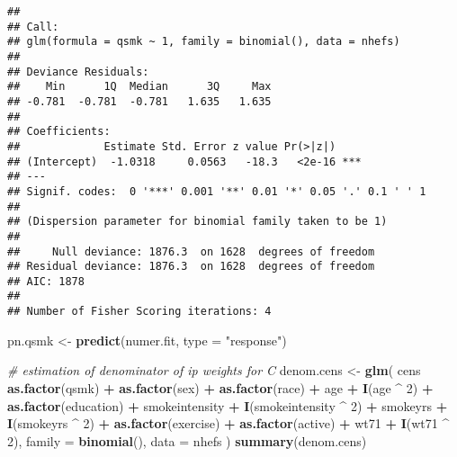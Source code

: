 \documentclass[10pt,]{book}
\newenvironment{Shaded}{\begin{snugshade}}{\end{snugshade}}
\newcommand{\CommentTok}[1]{\textcolor[rgb]{0.56,0.35,0.01}{\textit{#1}}}
\newcommand{\DataTypeTok}[1]{\textcolor[rgb]{0.13,0.29,0.53}{#1}}
\newcommand{\DecValTok}[1]{\textcolor[rgb]{0.00,0.00,0.81}{#1}}
\newcommand{\KeywordTok}[1]{\textcolor[rgb]{0.13,0.29,0.53}{\textbf{#1}}}
\newcommand{\NormalTok}[1]{#1}
\newcommand{\OperatorTok}[1]{\textcolor[rgb]{0.81,0.36,0.00}{\textbf{#1}}}
\newcommand{\StringTok}[1]{\textcolor[rgb]{0.31,0.60,0.02}{#1}}
\begin{document}
\begin{verbatim}
## 
## Call:
## glm(formula = qsmk ~ 1, family = binomial(), data = nhefs)
## 
## Deviance Residuals: 
##    Min      1Q  Median      3Q     Max  
## -0.781  -0.781  -0.781   1.635   1.635  
## 
## Coefficients:
##             Estimate Std. Error z value Pr(>|z|)    
## (Intercept)  -1.0318     0.0563   -18.3   <2e-16 ***
## ---
## Signif. codes:  0 '***' 0.001 '**' 0.01 '*' 0.05 '.' 0.1 ' ' 1
## 
## (Dispersion parameter for binomial family taken to be 1)
## 
##     Null deviance: 1876.3  on 1628  degrees of freedom
## Residual deviance: 1876.3  on 1628  degrees of freedom
## AIC: 1878
## 
## Number of Fisher Scoring iterations: 4
\end{verbatim}

\begin{Shaded}
\begin{Highlighting}[]
\NormalTok{pn.qsmk <-}\StringTok{ }\KeywordTok{predict}\NormalTok{(numer.fit, }\DataTypeTok{type =} \StringTok{"response"}\NormalTok{)}

\CommentTok{# estimation of denominator of ip weights for C}
\NormalTok{denom.cens <-}\StringTok{ }\KeywordTok{glm}\NormalTok{(}
\NormalTok{  cens }\OperatorTok{~}\StringTok{ }\KeywordTok{as.factor}\NormalTok{(qsmk) }\OperatorTok{+}\StringTok{ }\KeywordTok{as.factor}\NormalTok{(sex) }\OperatorTok{+}
\StringTok{    }\KeywordTok{as.factor}\NormalTok{(race) }\OperatorTok{+}\StringTok{ }\NormalTok{age }\OperatorTok{+}\StringTok{ }\KeywordTok{I}\NormalTok{(age }\OperatorTok{^}\StringTok{ }\DecValTok{2}\NormalTok{) }\OperatorTok{+}
\StringTok{    }\KeywordTok{as.factor}\NormalTok{(education) }\OperatorTok{+}\StringTok{ }\NormalTok{smokeintensity }\OperatorTok{+}
\StringTok{    }\KeywordTok{I}\NormalTok{(smokeintensity }\OperatorTok{^}\StringTok{ }\DecValTok{2}\NormalTok{) }\OperatorTok{+}\StringTok{ }\NormalTok{smokeyrs }\OperatorTok{+}\StringTok{ }\KeywordTok{I}\NormalTok{(smokeyrs }\OperatorTok{^}\StringTok{ }\DecValTok{2}\NormalTok{) }\OperatorTok{+}
\StringTok{    }\KeywordTok{as.factor}\NormalTok{(exercise) }\OperatorTok{+}\StringTok{ }\KeywordTok{as.factor}\NormalTok{(active) }\OperatorTok{+}\StringTok{ }\NormalTok{wt71 }\OperatorTok{+}\StringTok{ }\KeywordTok{I}\NormalTok{(wt71 }\OperatorTok{^}\StringTok{ }\DecValTok{2}\NormalTok{),}
  \DataTypeTok{family =} \KeywordTok{binomial}\NormalTok{(),}
  \DataTypeTok{data =}\NormalTok{ nhefs}
\NormalTok{)}
\KeywordTok{summary}\NormalTok{(denom.cens)}
\end{Highlighting}
\end{Shaded}
\end{document}
